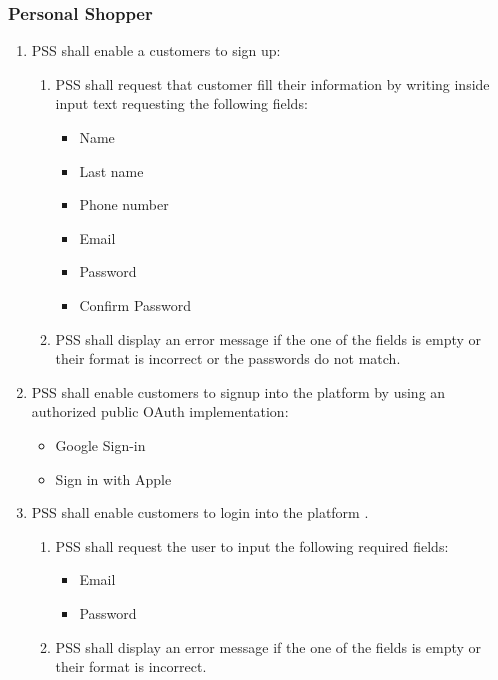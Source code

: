 \subsubsection{Personal Shopper}
\begin{enumerate}[label=SY-\arabic*]
    \item PSS shall enable a customers to sign up:
    \begin{enumerate}[label=SY-1.\arabic*]
        \item PSS shall request that customer fill their information by
        writing inside input text requesting the following fields:
        \begin{itemize}
            \item Name
            \item Last name
            \item Phone number
            \item Email
            \item Password
            \item Confirm Password
        \end{itemize}
        \item PSS shall display an error message if the one of the fields is 
        empty or their format is incorrect or the passwords do not match.
    \end{enumerate}
    \item PSS shall enable customers to signup into the platform by using an 
    authorized public OAuth implementation:
    \begin{itemize}
        \item Google Sign-in \cite{google-sign-in}
        \item Sign in with Apple \cite{sign-in-with-apple}
    \end{itemize}
    \item PSS shall enable customers to login into the platform .
    \begin{enumerate}[label=SY-3.\arabic*]
        \item PSS shall request the user to input the following required 
        fields:
        \begin{itemize}
            \item Email
            \item Password
        \end{itemize}
        \item PSS shall display an error message if the one of the fields is 
        empty or their format is incorrect.

\end{enumerate}
\end{enumerate}
